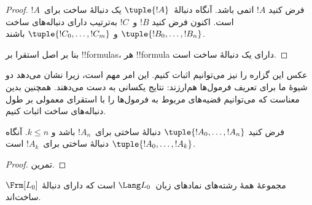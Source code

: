 \documentclass[../../../include/open-logic-section]{subfiles}
\begin{document}
\begin{proof}
فرض کنید $!A$ اتمی باشد. آنگاه دنبالهٔ~$\tuple{!A}$ یک دنبالهٔ ساخت
برای~$!A$ است.
%
اکنون فرض کنید $!B$ و~$!C$ به‌ترتیب دارای دنباله‌های ساخت
$\tuple{!B_0,\dotsc,!B_n}$ و $\tuple{!C_0,\dotsc,!C_m}$ باشند.
%
\begin{enumerate}
\end{enumerate}
بنا بر اصل استقرا بر !!{formula}s،
هر !!{formula} دارای یک دنبالهٔ ساخت است.
\end{proof}

عکس این گزاره را نیز می‌توانیم اثبات کنیم. این امر مهم است، زیرا نشان می‌دهد
دو شیوهٔ ما برای تعریف فرمول‌ها هم‌ارزند: نتایج یکسانی به دست می‌دهند. همچنین
بدین معناست که می‌توانیم قضیه‌های مربوط به فرمول‌ها را با استقرای معمولی بر
طول دنباله‌های ساخت اثبات کنیم.

\begin{lem}
فرض کنید $\tuple{!A_0,\dotsc,!A_n}$ دنبالهٔ ساختی برای~$!A_n$ باشد و
$k \leq n$. آنگاه $\tuple{!A_0,\dotsc,!A_k}$ دنبالهٔ ساختی
برای~$!A_k$ است.
\end{lem}

\begin{proof}
تمرین.
\end{proof}

\begin{thm}
$\Frm[L_0]$ مجموعهٔ همهٔ رشته‌های نمادهای زبان~$\Lang L_0$ است که
دارای دنبالهٔ ساخت‌اند.
\end{thm}
\end{document}
